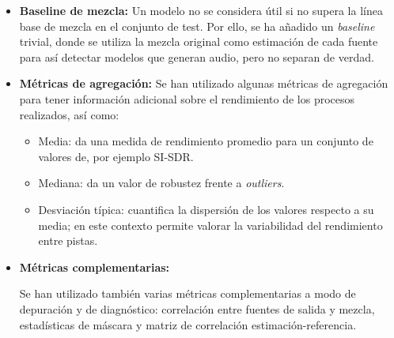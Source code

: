 \begin{itemize}
\item \textbf{Baseline de mezcla:}
Un modelo no se considera útil si no supera la línea base de mezcla en el conjunto de test. Por ello, se ha añadido un \textit{baseline} trivial, donde se utiliza la mezcla original como estimación de cada fuente para así detectar modelos
que generan audio, pero no separan de verdad.

    \item \textbf{Métricas de agregación:}
Se han utilizado algunas métricas de agregación para tener información adicional sobre el rendimiento de los procesos realizados, así como:
\begin{itemize}
    \item Media: da una medida de rendimiento promedio para un conjunto de valores de, por ejemplo SI-SDR.
    \item Mediana: da un valor de robustez frente a \textit{outliers}.
    \item Desviación típica: cuantifica la dispersión de los valores respecto a su media; en este contexto permite valorar la variabilidad del rendimiento entre pistas.
\end{itemize}

\item \textbf{Métricas complementarias:}

Se han utilizado también varias métricas complementarias a modo de depuración y de diagnóstico: correlación entre fuentes de salida y mezcla, estadísticas de máscara y matriz de correlación estimación-referencia.

    
\end{itemize}















